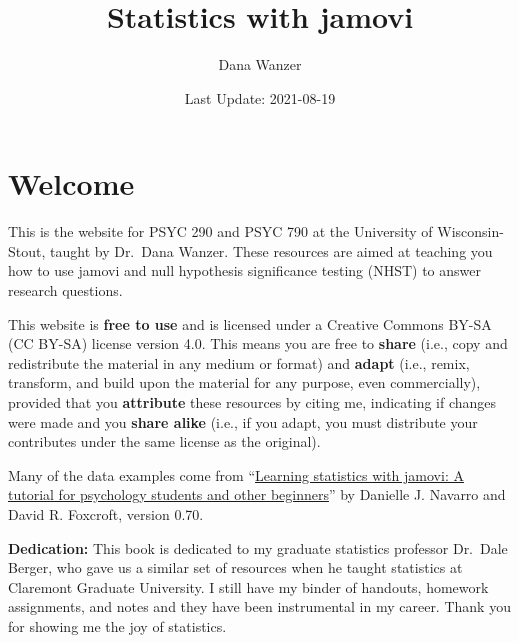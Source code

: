 \documentclass[
]{book}
\title{Statistics with jamovi}
\author{Dana Wanzer}
\date{Last Update: 2021-08-19}
\begin{document}
\maketitle

{
\setcounter{tocdepth}{1}
\tableofcontents
}
\hypertarget{welcome}{%
\chapter*{Welcome}\label{welcome}}

This is the website for PSYC 290 and PSYC 790 at the University of Wisconsin-Stout, taught by Dr.~Dana Wanzer. These resources are aimed at teaching you how to use jamovi and null hypothesis significance testing (NHST) to answer research questions.

This website is \textbf{free to use} and is licensed under a Creative Commons BY-SA (CC BY-SA) license version 4.0. This means you are free to \textbf{share} (i.e., copy and redistribute the material in any medium or format) and \textbf{adapt} (i.e., remix, transform, and build upon the material for any purpose, even commercially), provided that you \textbf{attribute} these resources by citing me, indicating if changes were made and you \textbf{share alike} (i.e., if you adapt, you must distribute your contributes under the same license as the original).

Many of the data examples come from ``\href{http://www.learnstatswithjamovi.com}{Learning statistics with jamovi: A tutorial for psychology students and other beginners}'' by Danielle J. Navarro and David R. Foxcroft, version 0.70.

\textbf{Dedication:} This book is dedicated to my graduate statistics professor Dr.~Dale Berger, who gave us a similar set of resources when he taught statistics at Claremont Graduate University. I still have my binder of handouts, homework assignments, and notes and they have been instrumental in my career. Thank you for showing me the joy of statistics.
\end{document}
